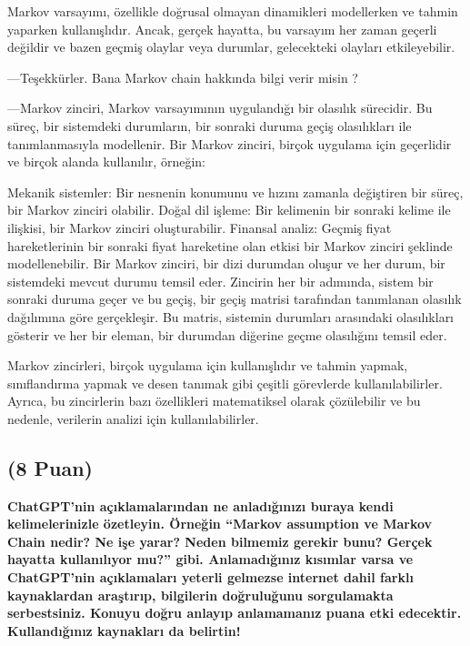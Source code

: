 \documentclass[11pt]{article}
\begin{document}
Markov varsayımı, özellikle doğrusal olmayan dinamikleri modellerken ve tahmin yaparken kullanışlıdır. Ancak, gerçek hayatta, bu varsayım her zaman geçerli değildir ve bazen geçmiş olaylar veya durumlar, gelecekteki olayları etkileyebilir.

---Teşekkürler. Bana Markov chain hakkında bilgi verir misin ?

---Markov zinciri, Markov varsayımının uygulandığı bir olasılık sürecidir. Bu süreç, bir sistemdeki durumların, bir sonraki duruma geçiş olasılıkları ile tanımlanmasıyla modellenir. Bir Markov zinciri, birçok uygulama için geçerlidir ve birçok alanda kullanılır, örneğin:

Mekanik sistemler: Bir nesnenin konumunu ve hızını zamanla değiştiren bir süreç, bir Markov zinciri olabilir.
Doğal dil işleme: Bir kelimenin bir sonraki kelime ile ilişkisi, bir Markov zinciri oluşturabilir.
Finansal analiz: Geçmiş fiyat hareketlerinin bir sonraki fiyat hareketine olan etkisi bir Markov zinciri şeklinde modellenebilir.
Bir Markov zinciri, bir dizi durumdan oluşur ve her durum, bir sistemdeki mevcut durumu temsil eder. Zincirin her bir adımında, sistem bir sonraki duruma geçer ve bu geçiş, bir geçiş matrisi tarafından tanımlanan olasılık dağılımına göre gerçekleşir. Bu matris, sistemin durumları arasındaki olasılıkları gösterir ve her bir eleman, bir durumdan diğerine geçme olasılığını temsil eder.

Markov zincirleri, birçok uygulama için kullanışlıdır ve tahmin yapmak, sınıflandırma yapmak ve desen tanımak gibi çeşitli görevlerde kullanılabilirler. Ayrıca, bu zincirlerin bazı özellikleri matematiksel olarak çözülebilir ve bu nedenle, verilerin analizi için kullanılabilirler.

\newpage
\subsection{(8 Puan)} \textbf{ChatGPT’nin açıklamalarından ne anladığınızı buraya kendi kelimelerinizle özetleyin. Örneğin ``Markov assumption ve Markov Chain nedir? Ne işe yarar? Neden bilmemiz gerekir bunu? Gerçek hayatta kullanılıyor mu?'' gibi. Anlamadığınız kısımlar varsa ve ChatGPT’nin açıklamaları yeterli gelmezse internet dahil farklı kaynaklardan araştırıp, bilgilerin doğruluğunu sorgulamakta serbestsiniz. Konuyu doğru anlayıp anlamamanız puana etki edecektir. Kullandığınız kaynakları da belirtin!}
\end{document}

